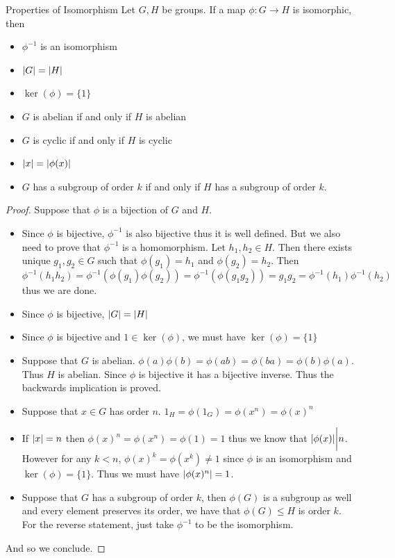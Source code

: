 \documentclass[a4paper]{article}
\begin{document}
\begin{prp}{Properties of Isomorphism}{} Let $G,H$ be groups. If a map $\phi:G\to H$ is isomorphic, then
\begin{itemize}
\item $\phi^{-1}$ is an isomorphism
\item $\abs{G}=\abs{H}$
\item $\ker(\phi)=\{1\}$
\item $G$ is abelian if and only if $H$ is abelian
\item $G$ is cyclic if and only if $H$ is cyclic
\item $\abs{x}=\abs{\phi(x)}$
\item $G$ has a subgroup of order $k$ if and only if $H$ has a subgroup of order $k$. 
\end{itemize}
\begin{proof} Suppose that $\phi$ is a bijection of $G$ and $H$. 
\begin{itemize}
\item Since $\phi$ is bijective, $\phi^{-1}$ is also bijective thus it is well defined. But we also need to prove that $\phi^{-1}$ is a homomorphism. Let $h_1,h_2\in H$. Then there exists unique $g_1,g_2\in G$ such that $\phi(g_1)=h_1$ and $\phi(g_2)=h_2$. Then $$\phi^{-1}(h_1h_2)=\phi^{-1}(\phi(g_1)\phi(g_2))=\phi^{-1}(\phi(g_1g_2))=g_1g_2=\phi^{-1}(h_1)\phi^{-1}(h_2)$$ thus we are done. 
\item Since $\phi$ is bijective, $\abs{G}=\abs{H}$
\item Since $\phi$ is bijective and $1\in\ker(\phi)$, we must have $\ker(\phi)=\{1\}$
\item Suppose that $G$ is abelian. $\phi(a)\phi(b)=\phi(ab)=\phi(ba)=\phi(b)\phi(a)$. Thus $H$ is abelian. Since $\phi$ is bijective it has a bijective inverse. Thus the backwards implication is proved. 
\item Suppose that $x\in G$ has order $n$. $1_H=\phi(1_G)=\phi(x^n)=\phi(x)^n$
\item If $\abs{x}=n$ then $\phi(x)^n=\phi(x^n)=\phi(1)=1$ thus we know that $\abs{\phi(x)}\bigg{|}n$. However for any $k<n$, $\phi(x)^k=\phi(x^k)\neq 1$ since $\phi$ is an isomorphism and $\ker(\phi)=\{1\}$. Thus we must have $\abs{\phi(x)^n}=1$. 
\item Suppose that $G$ has a subgroup of order $k$, then $\phi(G)$ is a subgroup as well and every element preserves its order, we have that $\phi(G)\leq H$ is order $k$. For the reverse statement, just take $\phi^{-1}$ to be the isomorphism. 
\end{itemize}
And so we conclude. 
\end{proof}
\end{prp}
\end{document}

